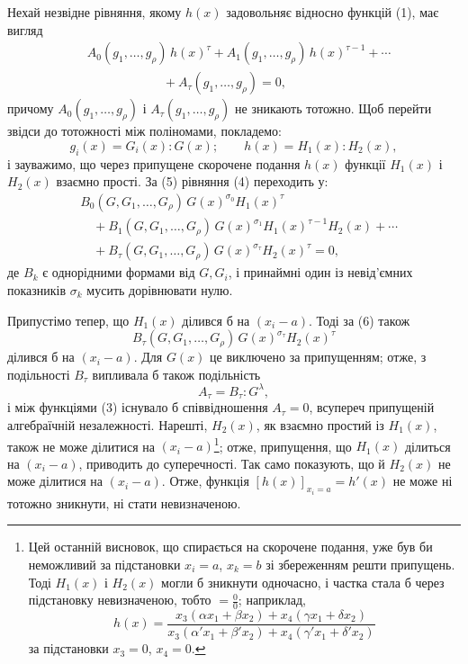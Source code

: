 \documentclass[11pt]{article}
\begin{document}
Нехай незвідне рівняння, якому $h(x)$ задовольняє відносно функцій (1), має вигляд
\begin{equation}
\begin{aligned}
&A_0(g_1,\ldots,g_\rho)\,h(x)^\tau
 +A_1(g_1,\ldots,g_\rho)\,h(x)^{\tau-1}
 +\cdots \\
&\hspace{6em}+A_\tau(g_1,\ldots,g_\rho)=0,
\end{aligned}
\tag{4}
\end{equation}
причому $A_0(g_1,\ldots,g_\rho)$ і $A_\tau(g_1,\ldots,g_\rho)$ не зникають тотожно. Щоб перейти звідси до тотожності між поліномами, покладемо:
\begin{equation}
  g_i(x)=G_i(x):G(x);\qquad h(x)=H_1(x):H_2(x),
\tag{5}
\end{equation}
і зауважимо, що через припущене скорочене подання $h(x)$ функції $H_1(x)$ і $H_2(x)$ взаємно прості. За (5) рівняння (4) переходить у:
\begin{equation}
\begin{aligned}
&B_0(G,G_1,\ldots,G_\rho)\,G(x)^{\sigma_0}H_1(x)^\tau \\
&\quad+B_1(G,G_1,\ldots,G_\rho)\,G(x)^{\sigma_1}H_1(x)^{\tau-1}H_2(x)+\cdots \\
&\quad+B_\tau(G,G_1,\ldots,G_\rho)\,G(x)^{\sigma_\tau}H_2(x)^\tau=0,
\end{aligned}
\tag{6}
\end{equation}
де $B_k$ є однорідними формами від $G,G_i$, і принаймні один із невід'ємних показників $\sigma_k$ мусить дорівнювати нулю.

Припустімо тепер, що $H_1(x)$ ділився б на $(x_i-a)$. Тоді за (6) також
\[
  B_\tau(G,G_1,\ldots,G_\rho)\,G(x)^{\sigma_\tau}H_2(x)^\tau
\]
ділився б на $(x_i-a)$. Для $G(x)$ це виключено за припущенням; отже, з подільності $B_\tau$ випливала б також подільність
\[
  A_\tau=B_\tau:G^\lambda,
\]
і між функціями (3) існувало б співвідношення $A_\tau=0$, всупереч припущеній алгебраїчній незалежності. Нарешті, $H_2(x)$, як взаємно простий із $H_1(x)$, також не може ділитися на $(x_i-a)$\footnote{Цей останній висновок, що спирається на скорочене подання, уже був би неможливий за підстановки $x_i=a$, $x_k=b$ зі збереженням решти припущень. Тоді $H_1(x)$ і $H_2(x)$ могли б зникнути одночасно, і частка стала б через підстановку невизначеною, тобто $=\frac{0}{0}$; наприклад,
\[
 h(x)=\frac{x_3(\alpha x_1+\beta x_2)+x_4(\gamma x_1+\delta x_2)}
 {x_3(\alpha' x_1+\beta' x_2)+x_4(\gamma' x_1+\delta' x_2)}
\]
за підстановки $x_3=0$, $x_4=0$.}; отже, припущення, що $H_1(x)$ ділиться на $(x_i-a)$, приводить до суперечності. Так само показують, що й $H_2(x)$ не може ділитися на $(x_i-a)$. Отже, функція $[h(x)]_{x_i=a}=h'(x)$ не може ні тотожно зникнути, ні стати невизначеною.
\end{document}
